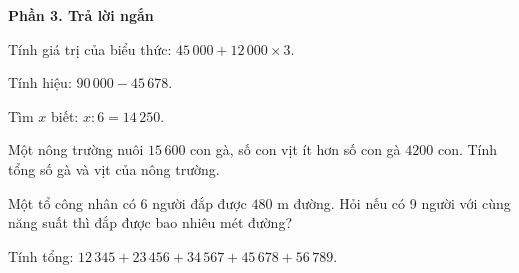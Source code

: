 \textbf{Phần 3. Trả lời ngắn}

\begin{ex} %
Tính giá trị của biểu thức: $45\,000 + 12\,000 \times 3$.
\end{ex}

\begin{ex} %
Tính hiệu: $90\,000 - 45\,678$.
\end{ex}

\begin{ex} %
Tìm $x$ biết: $x : 6 = 14\,250$.
\end{ex}

\begin{ex} %
Một nông trường nuôi $15\,600$ con gà, số con vịt ít hơn số con gà $4200$ con. Tính tổng số gà và vịt của nông trường.
\end{ex}

\begin{ex} %
Một tổ công nhân có 6 người đắp được $480\text{ m}$ đường. Hỏi nếu có 9 người với cùng năng suất thì đắp được bao nhiêu mét đường?
\end{ex}

\begin{ex} %
Tính tổng: $12\,345 + 23\,456 + 34\,567 + 45\,678 + 56\,789$.
\end{ex}
